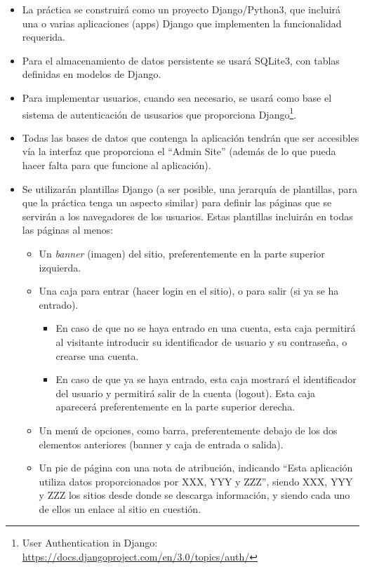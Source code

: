 \begin{itemize}

\item La práctica se construirá como un proyecto Django/Python3, que incluirá una o varias aplicaciones (apps) Django que implementen la funcionalidad requerida.

\item Para el almacenamiento de datos persistente se usará SQLite3, con tablas definidas en modelos de Django.

\item Para implementar usuarios, cuando sea necesario, se usará como base el sistema de autenticación de ususarios que proporciona Django\footnote{User Authentication in Django:\\ \url{https://docs.djangoproject.com/en/3.0/topics/auth/}}.

\item Todas las bases de datos que contenga la aplicación tendrán que ser accesibles vía la interfaz que proporciona el ``Admin Site'' (además de lo que pueda hacer falta para que funcione al aplicación).

\item Se utilizarán plantillas Django (a ser posible, una jerarquía de plantillas, para que la práctica tenga un aspecto similar) para definir las páginas que se servirán a los navegadores de los usuarios. Estas plantillas incluirán en todas las páginas al menos:

  \begin{itemize}
  \item Un \emph{banner} (imagen) del sitio, preferentemente en la parte superior izquierda.
  \item Una caja para entrar (hacer login en el sitio), o para salir (si ya se ha entrado).
    \begin{itemize}
    \item En caso de que no se haya entrado en una cuenta, esta caja permitirá al visitante introducir su identificador de usuario y su contraseña, o crearse una cuenta.
    \item En caso de que ya se haya entrado, esta caja mostrará el identificador del usuario y permitirá salir de la cuenta (logout). Esta caja aparecerá preferentemente en la parte superior derecha.
    \end{itemize}
  \item Un menú de opciones, como barra, preferentemente debajo de los dos elementos anteriores (banner y caja de entrada o salida).
  \item Un pie de página con una nota de atribución, indicando ``Esta aplicación utiliza datos proporcionados por XXX, YYY y ZZZ'', siendo XXX, YYY y ZZZ los sitios desde donde se descarga información, y siendo cada uno de ellos un enlace al sitio en cuestión.
  \end{itemize}


\end{itemize}
